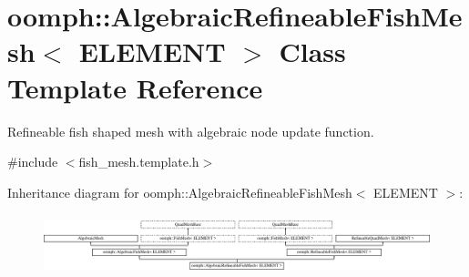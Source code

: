 \hypertarget{classoomph_1_1AlgebraicRefineableFishMesh}{}\section{oomph\+:\+:Algebraic\+Refineable\+Fish\+Mesh$<$ E\+L\+E\+M\+E\+NT $>$ Class Template Reference}
\label{classoomph_1_1AlgebraicRefineableFishMesh}


Refineable fish shaped mesh with algebraic node update function.  




{\ttfamily \#include $<$fish\+\_\+mesh.\+template.\+h$>$}

Inheritance diagram for oomph\+:\+:Algebraic\+Refineable\+Fish\+Mesh$<$ E\+L\+E\+M\+E\+NT $>$\+:\begin{figure}[H]
\begin{center}
\leavevmode
\includegraphics[height=1.777778cm]{classoomph_1_1AlgebraicRefineableFishMesh}
\end{center}
\end{figure}

